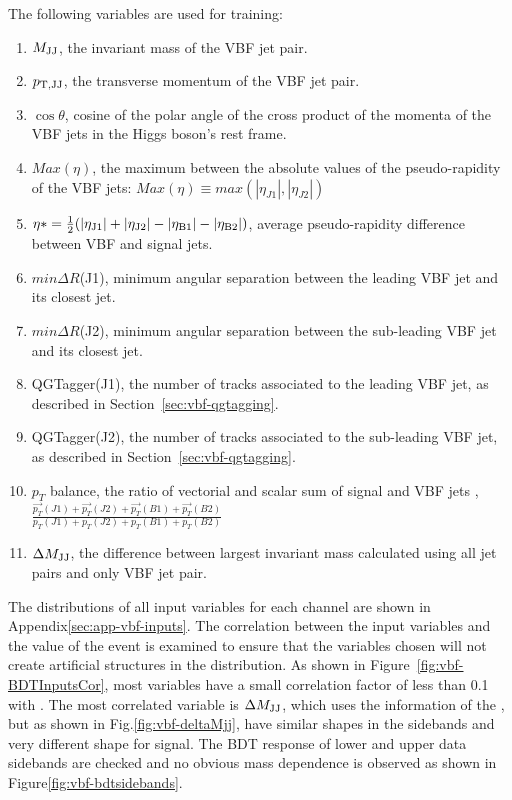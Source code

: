 The following variables are used for training:
\begin{enumerate}
\item $M_{\rm JJ}$, the invariant mass of the VBF jet pair. 
\item $p_{\rm T,JJ}$, the transverse momentum of the VBF jet pair. 
\item $\cos{\theta}$, cosine of the polar angle of the cross product of the momenta of the VBF jets in the Higgs boson's rest frame.
\item $Max (\eta)$, the maximum between the absolute values of the pseudo-rapidity of the VBF jets: $Max (\eta) \equiv max( |\eta_{J1}|, |\eta_{J2}| )$
\item $\eta* = \frac{1}{2}( |\eta_{\rm J1}| + |\eta_{\rm J2}| - |\eta_{\rm B1}| - |\eta_{\rm B2}|)$, average pseudo-rapidity difference between VBF and signal jets.
\item $min\Delta R$(J1), minimum angular separation between the leading VBF jet and its closest jet. 
\item $min\Delta R$(J2), minimum angular separation between the sub-leading VBF jet and its closest jet. 
\item QGTagger(J1),  the number of tracks associated to the leading VBF jet, as described in Section~\ref{sec:vbf-qgtagging}.
\item QGTagger(J2),  the number of tracks associated to the sub-leading VBF jet, as described in Section~\ref{sec:vbf-qgtagging}.
\item $p_{T}$ balance, the ratio of vectorial and scalar sum of signal and VBF jets \pT,  $\frac{\overrightarrow{p_{T}}(J1)+\overrightarrow{p_{T}}(J2)+\overrightarrow{p_{T}}(B1)+\overrightarrow{p_{T}}(B2) }{ p_{T}(J1)+p_{T}(J2)+p_{T}(B1)+p_{T}(B2)}$
\item $\Delta M_{\rm JJ}$, the difference between largest invariant mass calculated using all jet pairs and only VBF jet pair. 
\end{enumerate}

The distributions of all input variables for each channel are
shown in Appendix\ref{sec:app-vbf-inputs}.
The correlation between the input variables and the \Mbb value of the event
is examined to ensure that the variables chosen will not create artificial
structures in the \Mbb distribution.
As shown in Figure~\ref{fig:vbf-BDTInputsCor}, most variables have a
small correlation factor of less than 0.1 with \Mbb. The most correlated variable
is $\Delta M_{\rm JJ}$, which uses the information of the \bjets, but as shown in Fig.\ref{fig:vbf-deltaMjj},
have similar shapes in the sidebands and very different shape for signal.
The BDT response of lower and upper data sidebands are checked and no obvious
mass dependence is observed as shown in Figure\ref{fig:vbf-bdtsidebands}.

